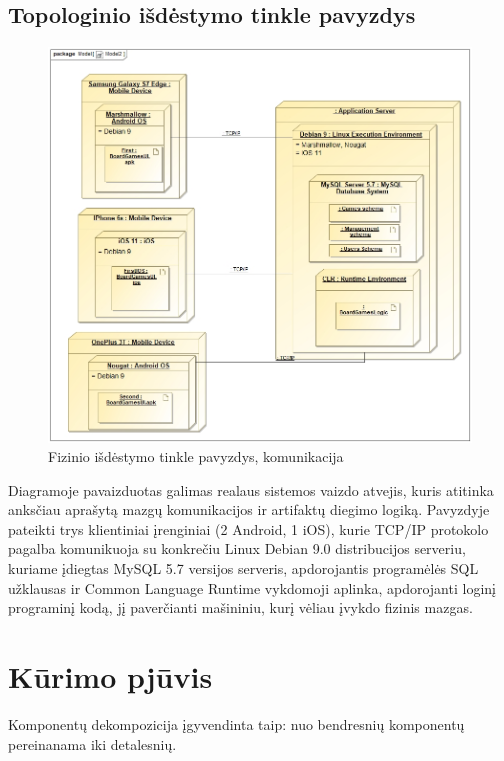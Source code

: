 \documentclass{VUMIFPSkursinis}
\begin{document}
	\subsection{Topologinio išdėstymo tinkle pavyzdys}
				\begin{figure}[H]
				\centering
				\includegraphics[scale=0.4]{img/TopologyExample}
				\caption{Fizinio išdėstymo tinkle pavyzdys, komunikacija}
				\label{img:TopologyExample}
			\end{figure}
		Diagramoje pavaizduotas galimas realaus sistemos vaizdo atvejis, kuris atitinka 		anksčiau aprašytą mazgų komunikacijos ir artifaktų diegimo logiką. Pavyzdyje 			pateikti trys klientiniai įrenginiai (2 Android, 1 iOS), kurie TCP/IP protokolo 		pagalba komunikuoja su konkrečiu Linux Debian 9.0 distribucijos serveriu, kuriame 			įdiegtas MySQL 5.7 versijos serveris, apdorojantis programėlės SQL užklausas ir 		Common Language Runtime vykdomoji aplinka, apdorojanti loginį programinį kodą, jį 			paverčianti mašininiu, kurį vėliau įvykdo fizinis mazgas.
		
\section{Kūrimo pjūvis}
Komponentų dekompozicija įgyvendinta taip: nuo bendresnių komponentų pereinanama iki detalesnių.
\end{document}
